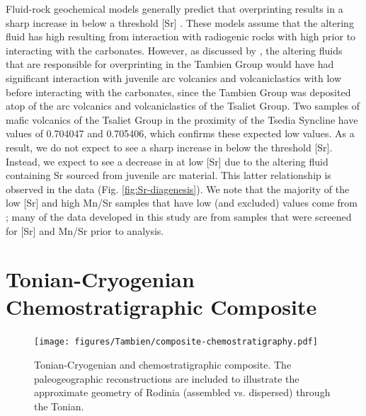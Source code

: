 Fluid-rock geochemical models generally predict that overprinting results in a sharp increase in \SrSr below a threshold [Sr] \citep{Banner1990a, Jacobsen1999a}. These models assume that the altering fluid has high \SrSr resulting from interaction with radiogenic rocks with high \SrSr prior to interacting with the carbonates. However, as discussed by \citet{Miller2009a}, the altering fluids that are responsible for overprinting in the Tambien Group would have had significant interaction with juvenile arc volcanics and volcaniclastics with low \SrSr before interacting with the carbonates, since the Tambien Group was deposited atop of the arc volcanics and volcaniclastics of the Tsaliet Group. Two samples of mafic volcanics of the Tsaliet Group in the proximity of the Tsedia Syncline have \SrSr values of 0.704047 and 0.705406, which confirms these expected low values. As a result, we do not expect to see a sharp increase in \SrSr below the threshold [Sr]. Instead, we expect to see a decrease in \SrSr at low [Sr] due to the altering fluid containing Sr sourced from juvenile arc material. This latter relationship is observed in the data (Fig. \ref{fig:Sr-diagenesis}). We note that the majority of the low [Sr] and high Mn/Sr samples that have low (and excluded) \SrSr  values come from \citet{Miller2009a}; many of the data developed in this study are from samples that were screened for [Sr] and Mn/Sr prior to \SrSr analysis.

\section{Tonian-Cryogenian Chemostratigraphic Composite}

\begin{figure}[h!]
\begin{center}
	\texttt{[image: figures/Tambien/composite-chemostratigraphy.pdf]}
	\caption[Tonian-Cryogenian \dC and \SrSr chemostratigraphic composite.]{Tonian-Cryogenian \dC and \SrSr chemostratigraphic composite. The paleogeographic reconstructions are included to illustrate the approximate geometry of Rodinia (assembled vs. dispersed) through the Tonian.}
	\label{fig:composite-chemostratigraphy}
\end{center}
\end{figure}

